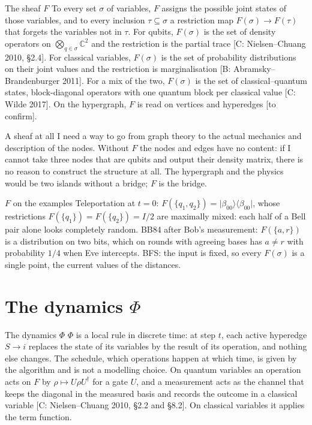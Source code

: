 \documentclass[11pt,a4paper]{article}
\providecommand{\ket}[1]{\lvert #1\rangle}
\providecommand{\bra}[1]{\langle #1\rvert}
\newcommand{\gr}[1]{\textsf{[#1]}}
\newcommand{\tc}{\textsf{[to confirm]}}
\begin{document}
\begin{defn}{The sheaf $F$}
To every set $\sigma$ of variables, $F$ assigns the possible joint states of those variables, and to every inclusion $\tau\subseteq\sigma$ a restriction map $F(\sigma)\to F(\tau)$ that forgets the variables not in $\tau$. For qubits, $F(\sigma)$ is the set of density operators on $\bigotimes_{q\in\sigma}\mathbb{C}^2$ and the restriction is the partial trace \gr{C: Nielsen--Chuang 2010, \S2.4}. For classical variables, $F(\sigma)$ is the set of probability distributions on their joint values and the restriction is marginalisation \gr{B: Abramsky--Brandenburger 2011}. For a mix of the two, $F(\sigma)$ is the set of classical--quantum states, block-diagonal operators with one quantum block per classical value \gr{C: Wilde 2017}. On the hypergraph, $F$ is read on vertices and hyperedges \tc.
\end{defn}

\begin{why}{A sheaf at all}
I need a way to go from graph theory to the actual mechanics and description of the nodes. Without $F$ the nodes and edges have no content: if I cannot take three nodes that are qubits and output their density matrix, there is no reason to construct the structure at all. The hypergraph and the physics would be two islands without a bridge; $F$ is the bridge.
\end{why}

\begin{ex}{$F$ on the examples}
Teleportation at $t=0$: $F(\{q_1,q_2\})=\ket{\beta_{00}}\bra{\beta_{00}}$, whose restrictions $F(\{q_1\})=F(\{q_2\})=I/2$ are maximally mixed: each half of a Bell pair alone looks completely random. BB84 after Bob's measurement: $F(\{a,r\})$ is a distribution on two bits, which on rounds with agreeing bases has $a\neq r$ with probability $1/4$ when Eve intercepts. BFS: the input is fixed, so every $F(\sigma)$ is a single point, the current values of the distances.
\end{ex}

\section{The dynamics $\Phi$}\label{sec:phi}

\begin{defn}{The dynamics $\Phi$}
$\Phi$ is a local rule in discrete time: at step $t$, each active hyperedge $S\to i$ replaces the state of its variables by the result of its operation, and nothing else changes. The schedule, which operations happen at which time, is given by the algorithm and is not a modelling choice. On quantum variables an operation acts on $F$ by $\rho\mapsto U\rho U^\dagger$ for a gate $U$, and a measurement acts as the channel that keeps the diagonal in the measured basis and records the outcome in a classical variable \gr{C: Nielsen--Chuang 2010, \S2.2 and \S8.2}. On classical variables it applies the term function.
\end{defn}
\end{document}
